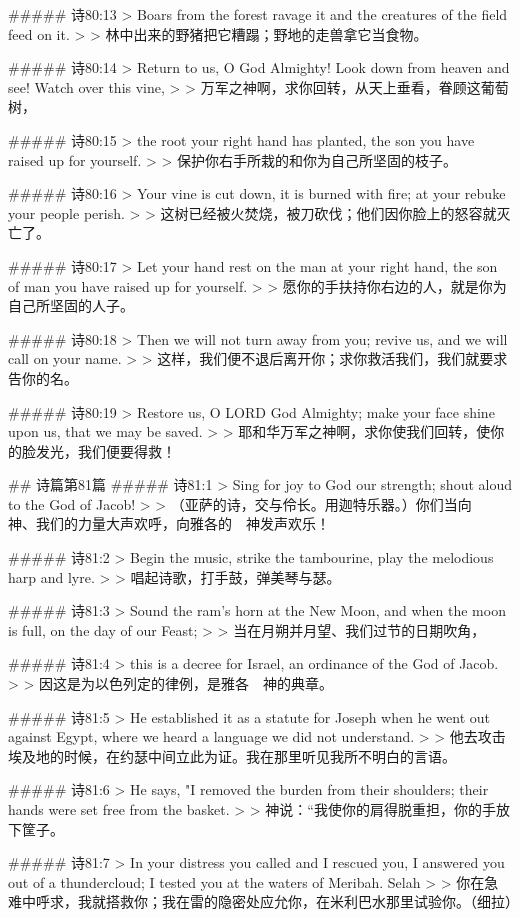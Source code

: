 ##### 诗80:13
> Boars from the forest ravage it and the creatures of the field feed on it.
>
> 林中出来的野猪把它糟蹋；野地的走兽拿它当食物。


##### 诗80:14
> Return to us, O God Almighty! Look down from heaven and see! Watch over this vine,
>
> 万军之神啊，求你回转，从天上垂看，眷顾这葡萄树，


##### 诗80:15
> the root your right hand has planted, the son you have raised up for yourself.
>
> 保护你右手所栽的和你为自己所坚固的枝子。


##### 诗80:16
> Your vine is cut down, it is burned with fire; at your rebuke your people perish.
>
> 这树已经被火焚烧，被刀砍伐；他们因你脸上的怒容就灭亡了。


##### 诗80:17
> Let your hand rest on the man at your right hand, the son of man you have raised up for yourself.
>
> 愿你的手扶持你右边的人，就是你为自己所坚固的人子。


##### 诗80:18
> Then we will not turn away from you; revive us, and we will call on your name.
>
> 这样，我们便不退后离开你；求你救活我们，我们就要求告你的名。


##### 诗80:19
> Restore us, O LORD God Almighty; make your face shine upon us, that we may be saved.
>
> 耶和华万军之神啊，求你使我们回转，使你的脸发光，我们便要得救！


## 诗篇第81篇
##### 诗81:1
> Sing for joy to God our strength; shout aloud to the God of Jacob!
>
> （亚萨的诗，交与伶长。用迦特乐器。）你们当向　神、我们的力量大声欢呼，向雅各的　神发声欢乐！


##### 诗81:2
> Begin the music, strike the tambourine, play the melodious harp and lyre.
>
> 唱起诗歌，打手鼓，弹美琴与瑟。


##### 诗81:3
> Sound the ram's horn at the New Moon, and when the moon is full, on the day of our Feast;
>
> 当在月朔并月望、我们过节的日期吹角，


##### 诗81:4
> this is a decree for Israel, an ordinance of the God of Jacob.
>
> 因这是为以色列定的律例，是雅各　神的典章。


##### 诗81:5
> He established it as a statute for Joseph when he went out against Egypt, where we heard a language we did not understand.
>
> 他去攻击埃及地的时候，在约瑟中间立此为证。我在那里听见我所不明白的言语。


##### 诗81:6
> He says, "I removed the burden from their shoulders; their hands were set free from the basket.
>
> 神说：“我使你的肩得脱重担，你的手放下筐子。


##### 诗81:7
> In your distress you called and I rescued you, I answered you out of a thundercloud; I tested you at the waters of Meribah. Selah
>
> 你在急难中呼求，我就搭救你；我在雷的隐密处应允你，在米利巴水那里试验你。（细拉）


